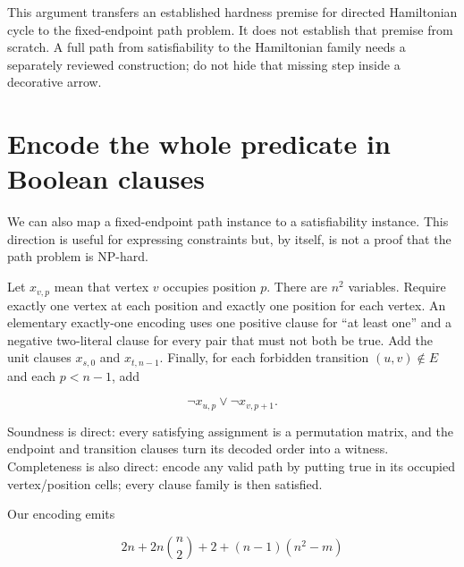 
This argument transfers an established hardness premise for directed
Hamiltonian cycle to the fixed-endpoint path problem. It does not
establish that premise from scratch. A full path from satisfiability to
the Hamiltonian family needs a separately reviewed construction; do not
hide that missing step inside a decorative arrow.

\section{Encode the whole predicate in Boolean
clauses}\label{encode-the-whole-predicate-in-boolean-clauses}

We can also map a fixed-endpoint path instance to a satisfiability
instance. This direction is useful for expressing constraints but, by
itself, is not a proof that the path problem is NP-hard.

Let \(x_{v,p}\) mean that vertex \(v\) occupies position \(p\). There
are \(n^2\) variables. Require exactly one vertex at each position and
exactly one position for each vertex. An elementary exactly-one encoding
uses one positive clause for ``at least one'' and a negative two-literal
clause for every pair that must not both be true. Add the unit clauses
\(x_{s,0}\) and \(x_{t,n-1}\). Finally, for each forbidden transition
\((u,v)\notin E\) and each \(p<n-1\), add

\begin{equation}
\neg x_{u,p}\lor\neg x_{v,p+1}.
\end{equation}


Soundness is direct: every satisfying assignment is a permutation
matrix, and the endpoint and transition clauses turn its decoded order
into a witness. Completeness is also direct: encode any valid path by
putting true in its occupied vertex/position cells; every clause family
is then satisfied.

Our encoding emits

\begin{equation}
2n+2n\binom n2+2+(n-1)(n^2-m)
\end{equation}

